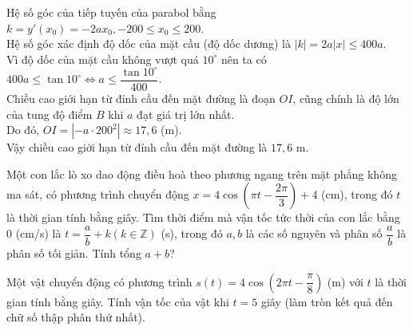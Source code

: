 \begin{bt}
{Hệ số góc của tiếp tuyến của parabol bằng $k=y'(x_0)=-2 a x_0,-200 \leq x_0 \leq 200$.\\
Hệ số góc xác định độ dốc của mặt cầu (độ dốc dương) là $|k|=2 a|x| \leq 400 a$.\\
Vì độ dốc của mặt cầu không vượt quá $10^\circ$ nên ta có
$400 a \leq \tan 10^\circ \Leftrightarrow a \leq \dfrac{\tan 10^\circ}{400}$.\\
Chiều cao giới hạn từ đỉnh cầu đến mặt đường là đoạn $O I$, cũng chính là độ lớn của tung độ điểm $B$ khi $a$ đạt giá trị lớn nhất.\\
Do đó, $O I=\left|-a \cdot 200^2\right|\approx 17{,}6$ (m).\\
Vậy chiều cao giới hạn từ đỉnh cầu đến mặt đường là $17{,}6$ m.
}
\end{bt}

\begin{bt}%

	Một con lắc lò xo dao động điều hoà theo phương ngang trên mặt phẳng không ma sát, có phương trình chuyển động $x=4\cos \left(\pi t-\dfrac{2\pi}{3} \right)+4$ (cm), trong đó $t$ là thời gian tính bằng giây. Tìm thời điểm mà vận tốc tức thời của con lắc bằng $0$ (cm/s) là $t=\dfrac{a}{b}+k(k\in \mathbb{Z})$ (s), trong đó $a,b$ là các số nguyên và phân số $\dfrac{a}{b}$ là phân số tối giản. Tính tổng $a+b$?
\end{bt}

\begin{bt}%

Một vật chuyển động có phương trình $s(t)=4\cos \left(2\pi t-\dfrac{\pi}{8} \right)$ (m) với $t$ là thời gian tính bằng giây. Tính vận tốc của vật khi $t=5$ giây (làm tròn kết quả đến chữ số thập phân thứ nhất).
\end{bt}

